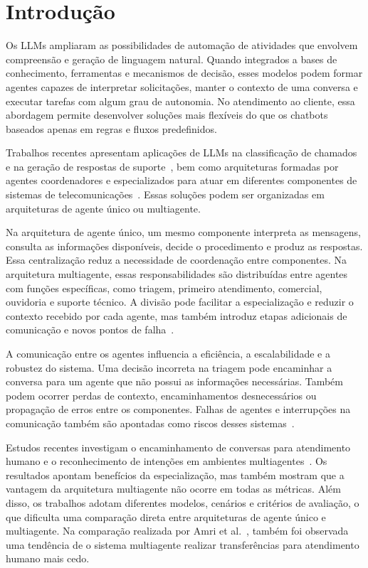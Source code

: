 \chapter{Introdução}\label{cap:introducao}

Os \glspl{LLM} ampliaram as possibilidades de automação de atividades que envolvem compreensão e geração de linguagem natural. Quando integrados a bases de conhecimento, ferramentas e mecanismos de decisão, esses modelos podem formar agentes capazes de interpretar solicitações, manter o contexto de uma conversa e executar tarefas com algum grau de autonomia. No atendimento ao cliente, essa abordagem permite desenvolver soluções mais flexíveis do que os chatbots baseados apenas em regras e fluxos predefinidos.

Trabalhos recentes apresentam aplicações de LLMs na classificação de chamados e na geração de respostas de suporte~\cite{moncada2025}, bem como arquiteturas formadas por agentes coordenadores e especializados para atuar em diferentes componentes de sistemas de telecomunicações~\cite{lee2025}. Essas soluções podem ser organizadas em arquiteturas de agente único ou multiagente.

Na arquitetura de agente único, um mesmo componente interpreta as mensagens, consulta as informações disponíveis, decide o procedimento e produz as respostas. Essa centralização reduz a necessidade de coordenação entre componentes. Na arquitetura multiagente, essas responsabilidades são distribuídas entre agentes com funções específicas, como triagem, primeiro atendimento, comercial, ouvidoria e suporte técnico. A divisão pode facilitar a especialização e reduzir o contexto recebido por cada agente, mas também introduz etapas adicionais de comunicação e novos pontos de falha~\cite{yan2026}.

A comunicação entre os agentes influencia a eficiência, a escalabilidade e a robustez do sistema. Uma decisão incorreta na triagem pode encaminhar a conversa para um agente que não possui as informações necessárias. Também podem ocorrer perdas de contexto, encaminhamentos desnecessários ou propagação de erros entre os componentes. Falhas de agentes e interrupções na comunicação também são apontadas como riscos desses sistemas~\cite{owotogbe2025}.

Estudos recentes investigam o encaminhamento de conversas para atendimento humano e o reconhecimento de intenções em ambientes multiagentes~\cite{amri2026,yang2025}. Os resultados apontam benefícios da especialização, mas também mostram que a vantagem da arquitetura multiagente não ocorre em todas as métricas. Além disso, os trabalhos adotam diferentes modelos, cenários e critérios de avaliação, o que dificulta uma comparação direta entre arquiteturas de agente único e multiagente. Na comparação realizada por Amri et al.~\cite{amri2026}, também foi observada uma tendência de o sistema multiagente realizar transferências para atendimento humano mais cedo.

